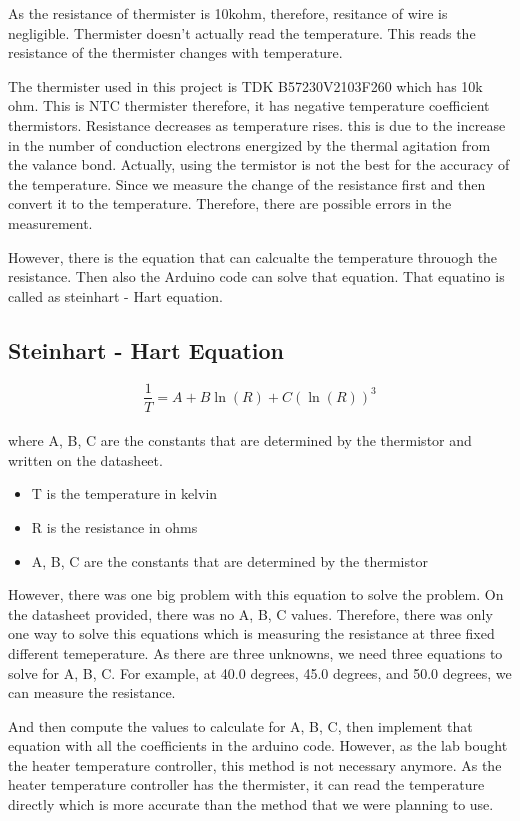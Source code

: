 \documentclass{article}
\begin{document}
As the resistance of thermister is 10kohm, therefore, resitance of 
wire is negligible.
Thermister doesn't actually read the temperature. 
This reads the resistance of the thermister changes with temperature.

The thermister used in this project is TDK B57230V2103F260 which has 10k ohm.
This is NTC thermister therefore, it has negative temperature coefficient thermistors.
Resistance decreases as temperature rises. 
this is due to the increase in the number of conduction electrons energized by the thermal
agitation from the valance bond. 
Actually, using the termistor is not the best for the accuracy of the temperature.
Since we measure the change of the resistance first and then convert it to the temperature.
Therefore, there are possible errors in the measurement.

However, there is the equation that can calcualte the temperature throuogh the resistance.
Then also the Arduino code can solve that equation. 
That equatino is called as steinhart - Hart equation.

\subsection{Steinhart - Hart Equation}

\LARGE
\begin{equation}
    \frac{1}{T} = A + B\ln(R) + C(\ln(R))^3
\end{equation}
\\
\normalsize
where A, B, C are the constants that are determined by the thermistor and written on the datasheet.
\begin{itemize}
    \item T is the temperature in kelvin
    \item R is the resistance in ohms
    \item A, B, C are the constants that are determined by the thermistor
\end{itemize}

However, there was one big problem with this equation to solve the problem.
On the datasheet provided, there was no A, B, C values.
Therefore, there was only one way to solve this equations which is measuring the resistance at 
three fixed different temeperature. 
As there are three unknowns, we need three equations to solve for A, B, C.
For example, at 40.0 degrees, 45.0 degrees, and 50.0 degrees, we can measure the resistance.

And then compute the values to calculate for A, B, C, then
implement that equation with all the coefficients in the arduino code. 
However, as the lab bought the heater temperature controller, this method is not necessary anymore.
As the heater temperature controller has the thermister, it can read the temperature directly which is 
more accurate than the method that we were planning to use. 
\end{document}
